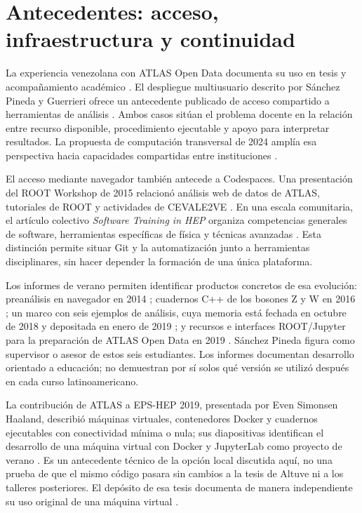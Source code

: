 \section{Antecedentes: acceso, infraestructura y continuidad}
La experiencia venezolana con ATLAS Open Data documenta su uso en tesis y acompañamiento académico \cite{atlas}. El despliegue multiusuario descrito por Sánchez Pineda y Guerrieri ofrece un antecedente publicado de acceso compartido a herramientas de análisis \cite{chep}. Ambos casos sitúan el problema docente en la relación entre recurso disponible, procedimiento ejecutable y apoyo para interpretar resultados. La propuesta de computación transversal de 2024 amplía esa perspectiva hacia capacidades compartidas entre instituciones \cite{whitepaper}.

El acceso mediante navegador también antecede a Codespaces. Una presentación del ROOT Workshop de 2015 relacionó análisis web de datos de ATLAS, tutoriales de ROOT y actividades de CEVALE2VE \cite{root2015}. En una escala comunitaria, el artículo colectivo \emph{Software Training in HEP} organiza competencias generales de software, herramientas específicas de física y técnicas avanzadas \cite{hsftraining}. Esta distinción permite situar Git y la automatización junto a herramientas disciplinares, sin hacer depender la formación de una única plataforma.

Los informes de verano permiten identificar productos concretos de esa evolución: preanálisis en navegador en 2014 \cite{moskalets}; cuadernos C++ de los bosones Z y W en 2016 \cite{banda,abah}; un marco con seis ejemplos de análisis, cuya memoria está fechada en octubre de 2018 y depositada en enero de 2019 \cite{lo}; y recursos e interfaces ROOT/Jupyter para la preparación de ATLAS Open Data en 2019 \cite{umedov,wang}. Sánchez Pineda figura como supervisor o asesor de estos seis estudiantes. Los informes documentan desarrollo orientado a educación; no demuestran por sí solos qué versión se utilizó después en cada curso latinoamericano.

La contribución de ATLAS a EPS-HEP 2019, presentada por Even Simonsen Haaland, describió máquinas virtuales, contenedores Docker y cuadernos ejecutables con conectividad mínima o nula; sus diapositivas identifican el desarrollo de una máquina virtual con Docker y JupyterLab como proyecto de verano \cite{offline2019}. Es un antecedente técnico de la opción local discutida aquí, no una prueba de que el mismo código pasara sin cambios a la tesis de Altuve ni a los talleres posteriores. El depósito de esa tesis documenta de manera independiente su uso original de una máquina virtual \cite{tesisaltuve}.

